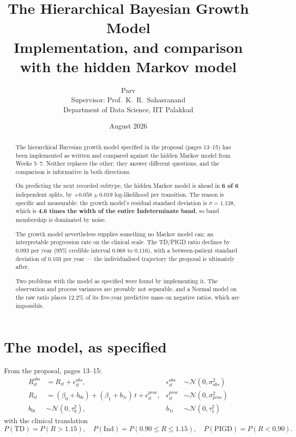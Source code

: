 \documentclass[11pt,a4paper]{article}
\title{\textbf{The Hierarchical Bayesian Growth Model}\\[0.4em]
       \large Implementation, and comparison with the hidden Markov model}
\author{Parv\\[0.3em]
        \small Supervisor: Prof.\ K.~R.\ Sahasranand\\
        \small Department of Data Science, IIT Palakkad}
\date{August 2026}
\begin{document}
\maketitle

\begin{abstract}
\noindent
The hierarchical Bayesian growth model specified in the proposal (pages 13--15)
has been implemented as written and compared against the hidden Markov model
from Weeks 5--7. Neither replaces the other; they answer different questions,
and the comparison is informative in both directions.

On predicting the next recorded subtype, the hidden Markov model is ahead in
\textbf{6 of 6} independent splits, by $+0.058 \pm 0.019$ log-likelihood per
transition. The reason is specific and measurable: the growth model's residual
standard deviation is $\sigma = 1.138$, which is \textbf{4.6 times the width of
the entire Indeterminate band}, so band membership is dominated by noise.

The growth model nevertheless supplies something no Markov model can: an
interpretable progression rate on the clinical scale. The TD/PIGD ratio
declines by $\mathbf{0.093}$ per year (95\% credible interval $0.068$ to
$0.116$), with a between-patient standard deviation of $0.103$ per year --- the
individualised trajectory the proposal is ultimately after.

Two problems with the model as specified were found by implementing it. The
observation and process variances are provably not separable, and a Normal
model on the raw ratio places 12.2\% of its five-year predictive mass on
negative ratios, which are impossible.
\end{abstract}

\section{The model, as specified}

From the proposal, pages 13--15:
\begin{align}
  R^{obs}_{it} &= R_{it} + \epsilon^{obs}_{it},
    &\epsilon^{obs}_{it} &\sim \mathcal{N}(0, \sigma^2_{obs}) \\
  R_{it} &= (\beta_0 + b_{0i}) + (\beta_1 + b_{1i})\, t + \epsilon^{proc}_{it},
    &\epsilon^{proc}_{it} &\sim \mathcal{N}(0, \sigma^2_{proc}) \\
  b_{0i} &\sim \mathcal{N}(0, \tau_0^2), &b_{1i} &\sim \mathcal{N}(0, \tau_1^2)
\end{align}
with the clinical translation
\[
  P(\mathrm{TD}) = P(R > 1.15), \quad
  P(\mathrm{Ind}) = P(0.90 \leq R \leq 1.15), \quad
  P(\mathrm{PIGD}) = P(R < 0.90).
\]
\end{document}
